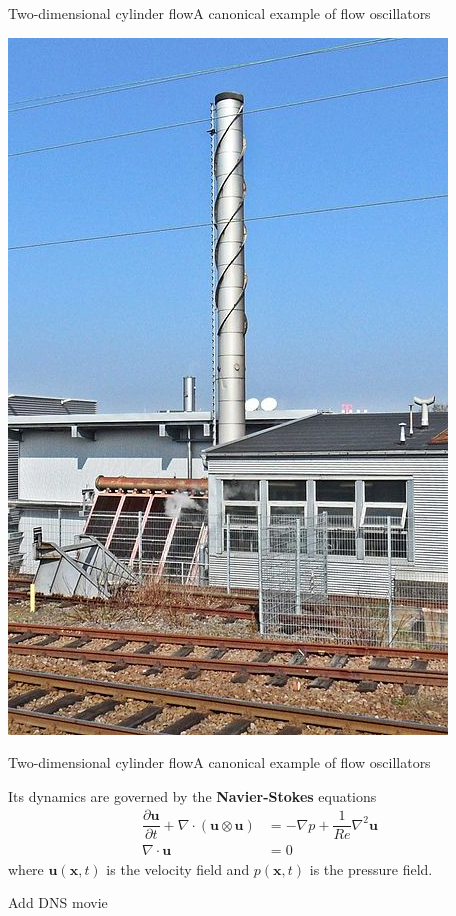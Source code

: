 \documentclass[usenames,dvipsnames,svgnames,10pt,aspectratio=169]{beamer}
\begin{document}
\begin{frame}[t, c]{Two-dimensional cylinder flow}{A canonical example of flow oscillators}
\begin{minipage}{.48\textwidth}
    \includegraphics[height=.75\textheight]{cheminee}
  \end{minipage}
\end{frame}





\begin{frame}[t, c]{Two-dimensional cylinder flow}{A canonical example of flow oscillators}
  \begin{minipage}{.68\textwidth}
    Its dynamics are governed by the \alert{\textbf{Navier-Stokes}} equations
    \[
    \begin{aligned}
      \dfrac{\partial \bm{u}}{\partial t} + \nabla \cdot \left( \bm{u} \otimes \bm{u} \right) & = -\nabla p + \dfrac{1}{Re} \nabla^2 \bm{u} \\
      \nabla \cdot \bm{u} & = 0
    \end{aligned}
    \]
    where $\bm{u}(\bm{x}, t)$ is the velocity field and $p(\bm{x}, t)$ is the pressure field.
  \end{minipage}%
  \hfill
  \begin{minipage}{.28\textwidth}
    Add DNS movie
  \end{minipage}
\end{frame}
\end{document}
